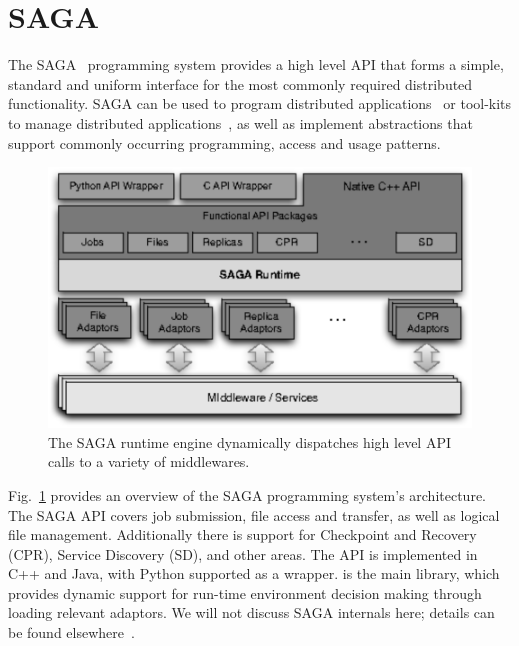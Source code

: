 \documentclass[graybox]{svmult}
\begin{document}



\section{SAGA}
\label{sec:saga}

The SAGA~\cite{saga-core, Kaiser:2006qp} programming system provides a
high level API that forms a simple, standard and uniform interface for
the most commonly required distributed functionality.  SAGA can be
used to program distributed applications~\cite{saga_escience07,
saga_tg08} or tool-kits to manage distributed
applications~\cite{Luckow:2008xy}, as well as implement abstractions
that support commonly occurring programming, access and usage
patterns.

\begin{figure}[t]
 \dnnn
 \includegraphics[width=1.0\textwidth]{saga-figure02-gray.pdf}
 \caption{The SAGA runtime engine dynamically dispatches high level
          API calls to a variety of middlewares.}
 \label{fig:saga}
\end{figure}

Fig.~\ref{fig:saga} provides an overview of the SAGA programming
system's architecture.  The SAGA API covers job submission, file
access and transfer, as well as logical file management.  Additionally
there is support for Checkpoint and Recovery (CPR), Service Discovery
(SD), and other areas.  The API is implemented in C++ and Java, with
Python supported as a wrapper.  is the main library,
which provides dynamic support for run-time environment decision
making through loading relevant adaptors. We will not discuss SAGA
internals here; details can be found elsewhere~\cite{saga_url,Kaiser:2006qp}.
\end{document}
